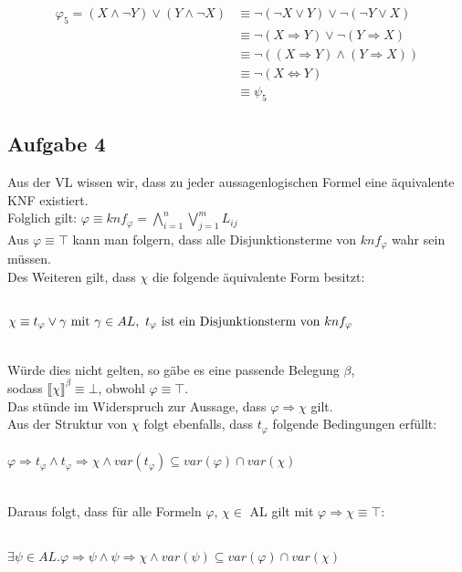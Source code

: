 \documentclass[a4paper,10pt]{article}
\begin{document}
	\begin{align*}
	\varphi_5 = (X \wedge\neg Y) \vee (Y \wedge \neg X) 
	&\equiv \neg (\neg X \vee Y) \vee \neg (\neg Y \vee X) \\
	&\equiv \neg (X \Rightarrow Y) \vee \neg (Y \Rightarrow X) \\
	&\equiv \neg ((X \Rightarrow Y) \wedge (Y \Rightarrow X)) \\
	&\equiv \neg (X \Leftrightarrow Y) \\
	&\equiv \psi_5 
	\end{align*}
	
	\subsection*{Aufgabe 4}
	Aus der VL wissen wir, dass zu jeder aussagenlogischen Formel eine äquivalente KNF existiert. \\
	Folglich gilt: $\varphi \equiv knf_{\varphi} = \bigwedge\limits_{i=1}^{n} \bigvee\limits_{j=1}^{m} L_{ij}$ \\
	Aus $\varphi \equiv \top$ kann man folgern, dass alle Disjunktionsterme von $knf_{\varphi}$ wahr sein müssen.\\
	Des Weiteren gilt, dass $\chi$ die folgende äquivalente Form besitzt:
	
	\ \\ \( \chi \equiv t_{\varphi} \vee \gamma \text{ mit } \\
	\gamma \in AL,~t_{\varphi} \text{ ist ein Disjunktionsterm von } knf_{\varphi} \) 	
	
	\ \\Würde dies nicht gelten, so gäbe es eine passende Belegung $\beta$, \\
	sodass $\llbracket \chi \rrbracket ^\beta \equiv \bot$, obwohl $\varphi \equiv \top$. \\
	Das stünde im Widerspruch zur Aussage, dass $\varphi \Rightarrow \chi$ gilt. \\
	Aus der Struktur von $\chi$ folgt ebenfalls, dass $t_{\varphi}$ folgende Bedingungen erfüllt:\\
	\ \\ \(\varphi \Rightarrow t_{\varphi} \wedge t_{\varphi} \Rightarrow \chi \wedge var(t_{\varphi}) \subseteq 		  	var(\varphi) \cap var(\chi) \)
	
	\ \\Daraus folgt, dass für alle Formeln $\varphi$, $\chi \in$ AL gilt mit $\varphi \Rightarrow \chi \equiv \top$:
	
	\ \\ \( \exists \psi \in AL. \varphi \Rightarrow \psi \wedge 
	\psi \Rightarrow \chi \wedge var(\psi) \subseteq var(\varphi) \cap var(\chi) \)
\end{document}
